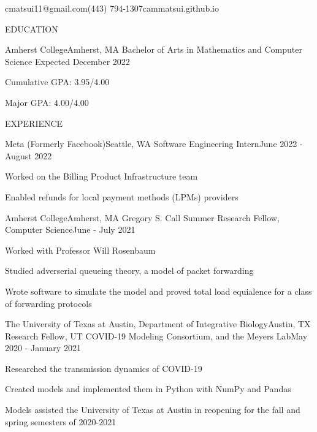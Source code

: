 \documentclass{article}
\begin{document}
\thispagestyle{empty}

        {cmatsui11@gmail.com}{(443) 794-1307}{cammatsui.github.io}

\begin{bigsection}{EDUCATION}
    \begin{sectionitem}{Amherst College}{Amherst, MA}
            {Bachelor of Arts in Mathematics and Computer Science}
            {Expected December 2022}
        \item Cumulative GPA: 3.95/4.00
        \item Major GPA: 4.00/4.00
    \end{sectionitem}
\end{bigsection}

\begin{bigsection}{EXPERIENCE}
    \begin{sectionitem}{Meta (Formerly Facebook)}{Seattle, WA}
            {Software Engineering Intern}{June 2022 - August 2022}
        \item Worked on the Billing Product Infrastructure team
        \item Enabled refunds for local payment methods (LPMs) providers
    \end{sectionitem}

    \begin{sectionitem}{Amherst College}{Amherst, MA}
            {Gregory S. Call Summer Research Fellow, Computer Science}{June - July 2021}
        \item Worked with Professor Will Rosenbaum
        \item Studied adverserial queueing theory, a model of packet forwarding
        \item Wrote software to simulate the model and proved total load equialence for a class of forwarding protocols
    \end{sectionitem}

    \begin{sectionitem}{The University of Texas at Austin, Department of Integrative Biology}{Austin, TX}
            {Research Fellow, UT COVID-19 Modeling Consortium, and the Meyers Lab}{May 2020 - January 2021}
        \item Researched the transmission dynamics of COVID-19
        \item Created models and implemented them in Python with NumPy and Pandas
        \item Models assisted the University of Texas at Austin in reopening for the fall and spring semesters of 2020-2021
    \end{sectionitem}
\end{bigsection}
\end{document}
